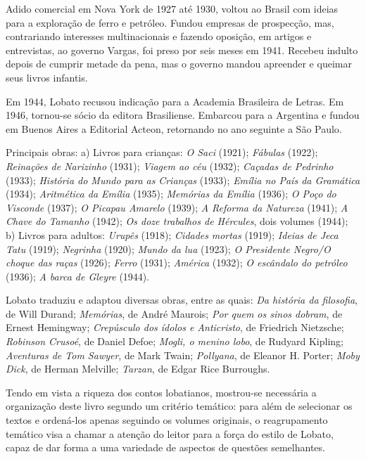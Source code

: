 \documentclass[12pt]{extarticle}
\begin{document}
Adido comercial em Nova York de 1927 até 1930, voltou ao Brasil com
ideias para a exploração de ferro e petróleo. Fundou empresas de
prospecção, mas, contrariando interesses multinacionais e fazendo
oposição, em artigos e entrevistas, ao governo Vargas, foi preso por
seis meses em 1941. Recebeu indulto depois de cumprir metade da pena,
mas o governo mandou apreender e queimar seus livros infantis.

Em 1944, Lobato recusou indicação para a Academia Brasileira de Letras.
Em 1946, tornou-se sócio da editora Brasiliense. Embarcou para a
Argentina e fundou em Buenos Aires a Editorial Acteon, retornando no ano
seguinte a São Paulo.

Principais obras: a) Livros para crianças: \emph{O Saci} (1921);
\emph{Fábulas} (1922); \emph{Reinações de Narizinho} (1931);
\emph{Viagem ao céu} (1932); \emph{Caçadas de Pedrinho} (1933);
\emph{História do Mundo para as} \emph{Crianças} (1933); \emph{Emília no
País da Gramática} (1934); \emph{Aritmética da Emília} (1935);
\emph{Memórias da Emília} (1936); \emph{O Poço do Visconde} (1937);
\emph{O Picapau Amarelo} (1939); \emph{A Reforma da Natureza} (1941);
\emph{A Chave do Tamanho} (1942); \emph{Os doze trabalhos de Hércules},
dois volumes (1944); b) Livros para adultos: \emph{Urupês} (1918);
\emph{Cidades} \emph{mortas} (1919); \emph{Ideias de Jeca Tatu} (1919);
\emph{Negrinha} (1920); \emph{Mundo da lua} (1923); \emph{O Presidente
Negro/O choque das raças} (1926); \emph{Ferro} (1931); \emph{América}
(1932); \emph{O escândalo do petróleo} (1936); \emph{A barca de Gleyre}
(1944).

Lobato traduziu e adaptou diversas obras, entre as quais: \emph{Da
história da filosofia}, de Will Durand; \emph{Memórias}, de André
Maurois; \emph{Por quem os sinos dobram}, de Ernest Hemingway;
\emph{Crepúsculo dos ídolos e Anticristo}, de Friedrich Nietzsche;
\emph{Robinson Crusoé}, de Daniel Defoe; \emph{Mogli, o menino lobo}, de
Rudyard Kipling; \emph{Aventuras de Tom Sawyer}, de Mark Twain;
\emph{Pollyana}, de Eleanor H. Porter; \emph{Moby Dick}, de Herman
Melville; \emph{Tarzan}, de Edgar Rice Burroughs.

Tendo em vista a riqueza dos contos lobatianos, mostrou-se necessária a
organização deste livro segundo um critério temático: para além de
selecionar os textos e ordená-los apenas seguindo os volumes originais,
o reagrupamento temático visa a chamar a atenção do leitor para a força
do estilo de Lobato, capaz de dar forma a uma variedade de aspectos de
questões semelhantes.
\end{document}
